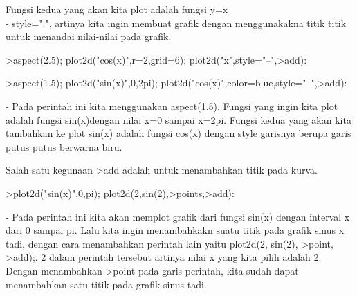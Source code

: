 \documentclass[a4paper,10pt]{article}
\begin{document}
\begin{eulernotebook}
\begin{eulercomment}
\begin{eulercomment}
\begin{eulercomment}
\begin{eulercomment}
\begin{eulercomment}
Fungsi kedua yang akan kita plot adalah fungsi y=x\\
- style=".", artinya kita ingin membuat grafik dengan menggunakakna
titik titik untuk menandai nilai-nilai pada grafik.
\end{eulercomment}
\begin{eulerprompt}
>aspect(2.5); plot2d("cos(x)",r=2,grid=6); plot2d("x",style="--",>add):
\end{eulerprompt}
\begin{eulerprompt}
>aspect(1.5); plot2d("sin(x)",0,2pi); plot2d("cos(x)",color=blue,style="--",>add):
\end{eulerprompt}
\begin{eulercomment}
- Pada perintah ini kita menggunakan aspect(1.5). Fungsi yang ingin
kita plot adalah fungsi sin(x)dengan nilai x=0 sampai x=2pi. Fungsi
kedua yang akan kita tambahkan ke plot sin(x) adalah fungsi cos(x)
dengan style garisnya berupa garis putus putus berwarna biru.

Salah satu kegunaan \textgreater{}add adalah untuk menambahkan titik pada kurva.
\end{eulercomment}
\begin{eulerprompt}
>plot2d("sin(x)",0,pi); plot2d(2,sin(2),>points,>add):
\end{eulerprompt}
\begin{eulercomment}
- Pada perintah ini kita akan memplot grafik dari fungsi sin(x) dengan
interval x dari 0 sampai pi. Lalu kita ingin menambahkakn suatu titik
pada grafik sinus x tadi, dengan cara menambahkan perintah lain yaitu
plot2d(2, sin(2), \textgreater{}point, \textgreater{}add);. 2 dalam perintah tersebut artinya
nilai x yang kita pilih adalah 2. Dengan menambahkan \textgreater{}point pada garis
perintah, kita sudah dapat menambahkan satu titik pada grafik sinus
tadi.


\end{eulercomment}
\end{eulercomment}
\end{eulercomment}
\end{eulercomment}
\end{eulercomment}
\end{eulernotebook}
\end{document}

